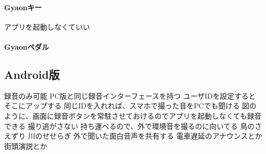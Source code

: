 \paragraph{Gyaonキー}
アプリを起動しなくていい

\paragraph{Gyaonペダル}

\subsection{Android版}
録音のみ可能
PC版と同じ録音インターフェースを持つ
ユーザIDを設定するとそこにアップする
同じIDを入れれば、スマホで撮った音をPCでも聞ける
図のように、画面に録音ボタンを常駐させておけるのでアプリを起動しなくても録音できる
撮り逃がさない
持ち運べるので、外で環境音を撮るのに向いてる
鳥のさえずり
川のせせらぎ
外で聞いた面白音声を共有する
電車遅延のアナウンスとか
街頭演説とか

